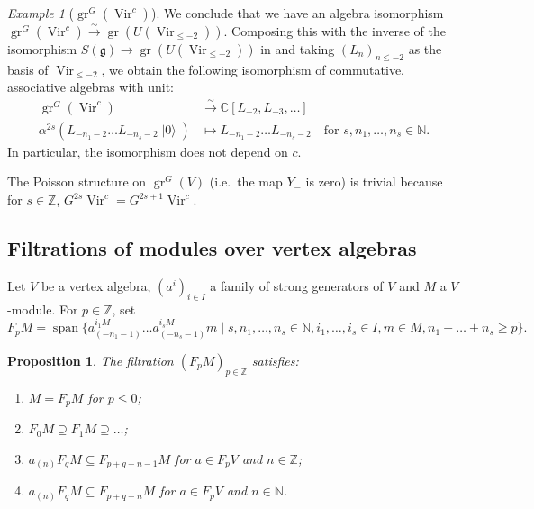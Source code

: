 \documentclass[a4paper, 12pt, reqno]{amsart}
\newtheorem{proposition}[theorem]{Proposition}
\theoremstyle{remark}
\newtheorem{example}[theorem]{Example}
\numberwithin{equation}{subsection}
\DeclareMathOperator{\Vir}{Vir}
\DeclareMathOperator{\gr}{gr}
\DeclareMathOperator{\vspan}{span}
\DeclareMathOperator{\vac}{|0\rangle}
\begin{document}
\begin{example}[$\gr^G(\Vir^c)$]
  We conclude that we have an algebra isomorphism $\gr^G(\Vir^c) \xrightarrow{\sim} \gr(U(\Vir_{\le -2}))$.
  Composing this with the inverse of the isomorphism $S(\mathfrak{g}) \to \gr(U(\Vir_{\le -2}))$ in  and taking $(L_n)_{n \le -2}$ as the basis of $\Vir_{\le -2}$, we obtain the following isomorphism of commutative, associative algebras with unit:
  \begin{align*}
  \gr^G(\Vir^c) &\xrightarrow{\sim} \mathbb{C}[L_{-2}, L_{-3}, \dots] \\
  \alpha^{2s}(L_{-n_1 - 2}\dots L_{-n_s - 2}\vac) &\mapsto L_{-n_1 - 2}\dots L_{-n_s - 2} \quad \text{for }s, n_1, \dots, n_s \in \mathbb{N}.
  \end{align*}
  In particular, the isomorphism does not depend on $c$.

  The Poisson structure on $\gr^G(V)$ (i.e.\ the map $Y_-$ is zero) is trivial because for $s \in \mathbb{Z}$, $G^{2s}\Vir^c = G^{2s + 1}\Vir^c$.
\end{example}

\subsection{Filtrations of modules over vertex algebras}
\label{sec:filtr-modul-over}

Let $V$ be a vertex algebra, $(a^i)_{i \in I}$ a family of strong generators of $V$ and $M$ a $V$-module.
For $p \in \mathbb{Z}$, set
\begin{equation*}
  F_pM = \vspan \{a^{i_1M}_{(-n_1 - 1)}\dots a^{i_sM}_{(-n_s - 1)}m \mid s, n_1, \dots, n_s \in \mathbb{N}, i_1, \dots, i_s \in I, m \in M, n_1 + \dots + n_s \ge p\}.
\end{equation*}

\begin{proposition}\cite{li_abelianizing_2005}
  \label{prp:10}
  The filtration $(F_pM)_{p \in \mathbb{Z}}$ satisfies:
  \begin{enumerate}
  \item $M = F_pM$ for $p \le 0$;
  \item $F_0M \supseteq F_1M \supseteq \dots$;
  \item $a_{(n)}F_qM \subseteq F_{p + q - n - 1}M$ for $a \in F_pV$ and $n \in \mathbb{Z}$;
  \item $a_{(n)}F_qM \subseteq F_{p + q - n}M$ for $a \in F_pV$ and $n \in \mathbb{N}$.
  \end{enumerate}
\end{proposition}
\end{document}
